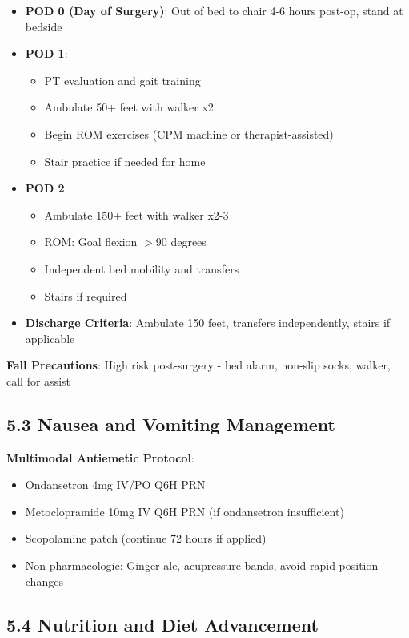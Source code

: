 \documentclass[11pt,letterpaper]{article}
\begin{document}
\begin{itemize}[leftmargin=*]
    \item \textbf{POD 0 (Day of Surgery)}: Out of bed to chair 4-6 hours post-op, stand at bedside
    \item \textbf{POD 1}:
    \begin{itemize}
        \item PT evaluation and gait training
        \item Ambulate 50+ feet with walker x2
        \item Begin ROM exercises (CPM machine or therapist-assisted)
        \item Stair practice if needed for home
    \end{itemize}
    \item \textbf{POD 2}:
    \begin{itemize}
        \item Ambulate 150+ feet with walker x2-3
        \item ROM: Goal flexion $>$90 degrees
        \item Independent bed mobility and transfers
        \item Stairs if required
    \end{itemize}
    \item \textbf{Discharge Criteria}: Ambulate 150 feet, transfers independently, stairs if applicable
\end{itemize}

\textbf{Fall Precautions}: High risk post-surgery - bed alarm, non-slip socks, walker, call for assist

\subsection*{5.3 Nausea and Vomiting Management}

\textbf{Multimodal Antiemetic Protocol}:
\begin{itemize}[leftmargin=*]
    \item Ondansetron 4mg IV/PO Q6H PRN
    \item Metoclopramide 10mg IV Q6H PRN (if ondansetron insufficient)
    \item Scopolamine patch (continue 72 hours if applied)
    \item Non-pharmacologic: Ginger ale, acupressure bands, avoid rapid position changes
\end{itemize}

\subsection*{5.4 Nutrition and Diet Advancement}
\end{document}

